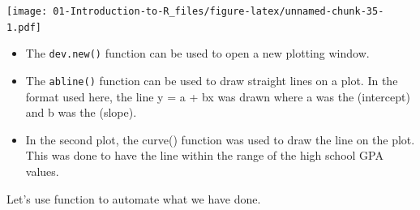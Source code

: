\documentclass[
]{book}
\theoremstyle{definition}
\theoremstyle{definition}
\theoremstyle{definition}
\theoremstyle{definition}
\theoremstyle{remark}
\begin{document}
\texttt{[image: 01-Introduction-to-R\_files/figure-latex/unnamed-chunk-35-1.pdf]}

\begin{itemize}
\item
  The \texttt{dev.new()} function can be used to open a new plotting window.
\item
  The \texttt{abline()} function can be used to draw straight lines on a plot. In the format used here, the line y = a + bx was drawn where a was the (intercept) and b was the (slope).
\item
  In the second plot, the curve() function was used to draw the line on the plot. This was done to have the line within the range of the high school GPA values.
\end{itemize}

Let's use function to automate what we have done.
\end{document}
